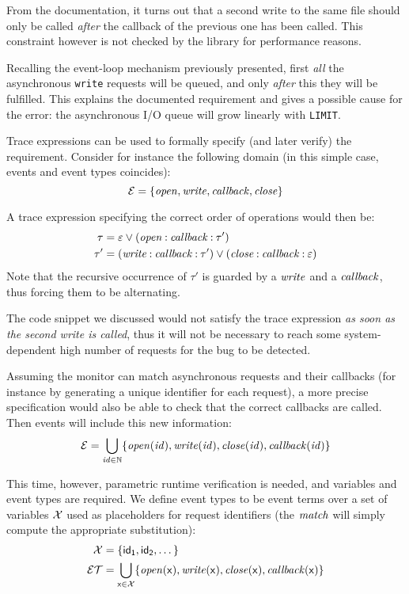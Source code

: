From the documentation, it turns out that a second write to the same file should only be called \emph{after} the callback of the previous one has been called.
This constraint however is not checked by the library for performance reasons.

Recalling the event-loop mechanism previously presented, first \emph{all} the asynchronous \lstinline{write} requests will be queued, and only \emph{after} this they will be fulfilled.
This explains the documented requirement and gives a possible cause for the error: the asynchronous I/O queue will grow linearly with \lstinline{LIMIT}.

Trace expressions can be used to formally specify (and later verify) the requirement.
Consider for instance the following domain (in this simple case, events and event types coincides):
\[ \mathcal{E} = \{ \mathit{open}, \mathit{write}, \mathit{callback}, \mathit{close} \} \]

A trace expression specifying the correct order of operations would then be:
\begin{align*}
\tau &= \varepsilon \mathbin{\vee} (\mathit{open} \mathbin{:} \mathit{callback} \mathbin{:} \tau')\\
\tau' &= (\mathit{write} \mathbin{:} \mathit{callback} \mathbin{:} \tau') \mathbin{\vee} (\mathit{close} \mathbin{:} \mathit{callback} \mathbin{:} \varepsilon)
\end{align*}
Note that the recursive occurrence of \(\tau'\) is guarded by a \(\mathit{write}\) and a \(\mathit{callback}\), thus forcing them to be alternating.

The code snippet we discussed would not satisfy the trace expression \emph{as soon as the second write is called}, thus it will not be necessary to reach some system-dependent high number of requests for the bug to be detected.

Assuming the monitor can match asynchronous requests and their callbacks (for instance by generating a unique identifier for each request), a more precise specification would also be able to check that the correct callbacks are called.
Then events will include this new information:
\[ \mathcal{E} = \bigcup_{\mathit{id} \in \mathbb{N}} \{\mathit{open}(\mathit{id}), \mathit{write}(\mathit{id}), \mathit{close}(\mathit{id}), \mathit{callback}(\mathit{id}) \} \]

This time, however, parametric runtime verification is needed, and variables and event types are required.
We define event types to be event terms over a set of variables \(\mathcal{X}\) used as placeholders for request identifiers (the \(\mathit{match}\) will simply compute the appropriate substitution):
\begin{align*}
\mathcal{X} &= \{ \mathsf{id_1}, \mathsf{id_2}, \dotsc \}\\
\mathcal{ET} &= \bigcup_{\mathsf{x} \in \mathcal{X}} \{\mathit{open}(\mathsf{x}), \mathit{write}(\mathsf{x}), \mathit{close}(\mathsf{x}), \mathit{callback}(\mathsf{x}) \}
\end{align*}

